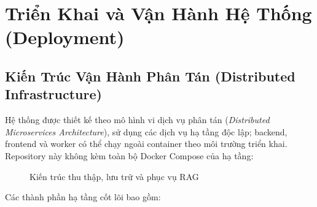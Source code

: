 
\chapter{Triển Khai và Vận Hành Hệ Thống (Deployment)}
\label{chap:deployment}

\section{Kiến Trúc Vận Hành Phân Tán (Distributed Infrastructure)}

Hệ thống được thiết kế theo mô hình vi dịch vụ phân tán (\textit{Distributed Microservices Architecture}), sử dụng các dịch vụ hạ tầng độc lập; backend, frontend và worker có thể chạy ngoài container theo môi trường triển khai. Repository này không kèm toàn bộ Docker Compose của hạ tầng:

\begin{figure}[htbp]
  \centering
  \DrawSystemArchitecture
  \caption[Kiến trúc thu thập, lưu trữ và phục vụ RAG]{Kiến trúc thu thập, lưu trữ và phục vụ RAG}
  \label{fig:system_architecture}
\end{figure}

Các thành phần hạ tầng cốt lõi bao gồm:

